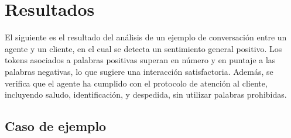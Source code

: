 \section{Resultados}
El siguiente es el resultado del análisis de un ejemplo de conversación entre un agente y un
cliente, en el cual se detecta un sentimiento general positivo. Los tokens asociados a palabras
positivas superan en número y en puntaje a las palabras negativas, lo que sugiere una
interacción satisfactoria. Además, se verifica que el agente ha cumplido con el protocolo de
atención al cliente, incluyendo saludo, identificación, y despedida, sin utilizar palabras
prohibidas.

\subsection*{Caso de ejemplo}
